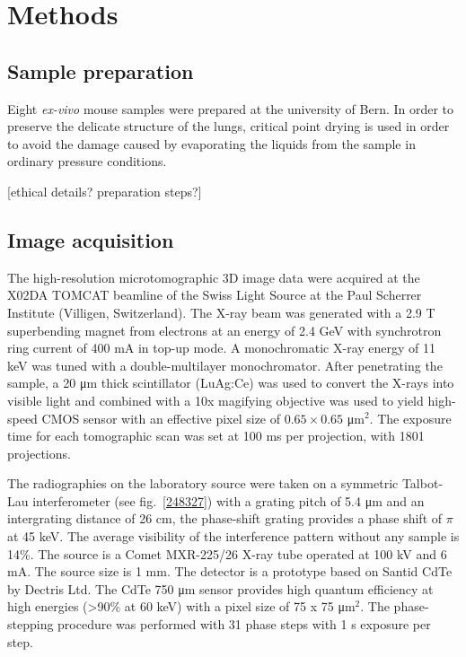 \section{Methods}\label{sec:methods}
\subsection{Sample preparation}
Eight \emph{ex-vivo} mouse samples were prepared at the university of Bern.
In order to preserve the delicate structure of the lungs, critical point
drying is used in order to avoid the damage caused by evaporating the liquids
from the sample in ordinary pressure conditions.

[ethical details? preparation steps?]

\subsection{Image acquisition}\label{sec:acquisition}
The high-resolution microtomographic 3D image data were acquired at the X02DA
TOMCAT beamline of the Swiss Light Source at the Paul Scherrer Institute
(Villigen, Switzerland). The X-ray beam was generated with a 2.9 T superbending
magnet from electrons at an energy of 2.4 GeV with synchrotron ring current of 400 mA in top-up mode. A monochromatic X-ray energy of 11 keV was tuned with a double-multilayer monochromator. After penetrating the sample, a 20 μm thick scintillator (LuAg:Ce) was used to convert the X-rays into visible light and combined with a 10x magifying objective was used to yield 
high-speed CMOS sensor with an effective pixel size of $0.65 \times 0.65$
μm$^2$. The exposure time for each tomographic scan was set at 100 ms per
projection, with 1801 projections.

The radiographies on the laboratory source were taken on a symmetric
Talbot-Lau interferometer (see fig.~\ref{248327}) with a grating pitch of 5.4 μm and an intergrating
distance of 26 cm, the phase-shift grating provides a phase shift of $\pi$
at 45 keV. The average visibility of the interference pattern without any
sample is 14\%. The source is a Comet MXR-225/26 X-ray tube operated at 100
kV and 6 mA. The source size is 1 mm. The detector is a prototype based on
Santid CdTe by Dectris Ltd. The CdTe 750 μm sensor provides high quantum
efficiency at high energies (>90\% at 60 keV) with a pixel size of 75 x 75
μm$^2$. The phase-stepping procedure was performed with 31 phase steps with
1 s exposure per step.
